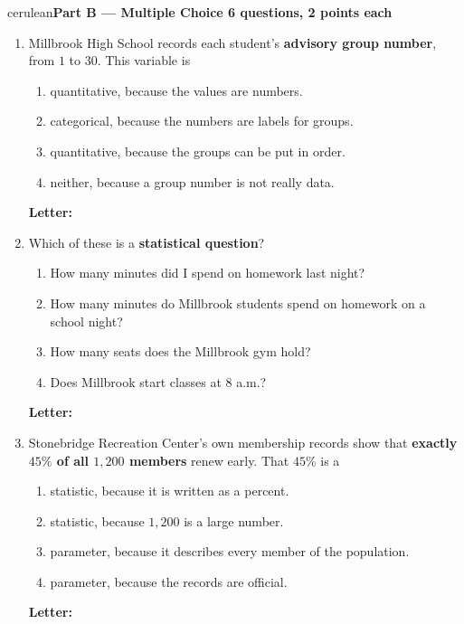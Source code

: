 \documentclass[10pt]{article}
\newcommand{\parthead}[1]{%
  \vspace{6pt}\noindent
  {\tcbset{after={\par\nopagebreak}}%
   \begin{headlinebox}{cerulean}{\color{white}\bfseries #1}\end{headlinebox}}%
  \nopagebreak\vspace{4pt}}
\begin{document}
\vspace{4pt}
\boxguard[8]
\parthead{Part B --- Multiple Choice \hfill 6 questions, 2 points each}

\small
\begin{enumerate}[leftmargin=2.2em, itemsep=5pt, topsep=2pt, start=9]

\item Millbrook High School records each student's \textbf{advisory group number}, from $1$ to
$30$. This variable is
\begin{enumerate}[label=(\Alph*), leftmargin=1.8em, itemsep=1pt, topsep=1pt]
  \item quantitative, because the values are numbers.
  \item categorical, because the numbers are labels for groups.
  \item quantitative, because the groups can be put in order.
  \item neither, because a group number is not really data.
\end{enumerate}
\hfill \textbf{Letter:} \gradedblank[id=q9, type=choice, points=2, answer={B}]{0.9cm}{11pt}

\item Which of these is a \textbf{statistical question}?
\begin{enumerate}[label=(\Alph*), leftmargin=1.8em, itemsep=1pt, topsep=1pt]
  \item How many minutes did I spend on homework last night?
  \item How many minutes do Millbrook students spend on homework on a school night?
  \item How many seats does the Millbrook gym hold?
  \item Does Millbrook start classes at 8 a.m.?
\end{enumerate}
\hfill \textbf{Letter:} \gradedblank[id=q10, type=choice, points=2, answer={B}]{0.9cm}{11pt}

\item Stonebridge Recreation Center's own membership records show that \textbf{exactly $45\%$
of all $1{,}200$ members} renew early. That $45\%$ is a
\begin{enumerate}[label=(\Alph*), leftmargin=1.8em, itemsep=1pt, topsep=1pt]
  \item statistic, because it is written as a percent.
  \item statistic, because $1{,}200$ is a large number.
  \item parameter, because it describes every member of the population.
  \item parameter, because the records are official.
\end{enumerate}
\hfill \textbf{Letter:} \gradedblank[id=q11, type=choice, points=2, answer={C}]{0.9cm}{11pt}


\end{enumerate}
\end{document}
